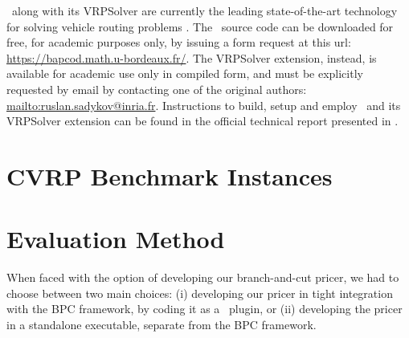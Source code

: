 \bapcod\ along with its VRPSolver are currently the leading state-of-the-art
technology for solving vehicle routing problems \parencite{pessoa2020a}.
The \bapcod\ source code can be downloaded for free, for academic purposes only,
by issuing a form request at this url: \url{https://bapcod.math.u-bordeaux.fr/}.
The VRPSolver extension, instead, is available for academic use only in compiled form,
and must be explicitly requested by email by contacting one of the
original authors: \url{mailto:ruslan.sadykov@inria.fr}.
Instructions to build, setup and employ \bapcod\ and its VRPSolver extension
can be found in the official technical report presented in \textcite{sadykov2021}.

\section{CVRP Benchmark Instances}
\label{sec:results-benchmark-instances}





\begin{comment}
\cite{uchoa2017}
THE CVRPLIB website
The typical instance repository of today is a web page that allows downloading the instance
files and includes additional textual information, like file format description, instance
source, best known/optimal solution values, etc. The CVRLIB web page, where the new
instances (and all the previous CVRP instances described in Section 2) are available
(http://vrp.galgos.inf.puc-rio.br/index.php/en/), is more sophisticated:
\end{comment}


\section{Evaluation Method}
\label{sec:results-evaluation-method}

When faced with the option of developing our branch-and-cut pricer,
we had to choose between two main choices:
(i) developing our pricer in tight integration with the BPC framework,
by coding it as a \bapcod\ plugin,
or (ii) developing the pricer in a standalone executable,
separate from the BPC framework.

